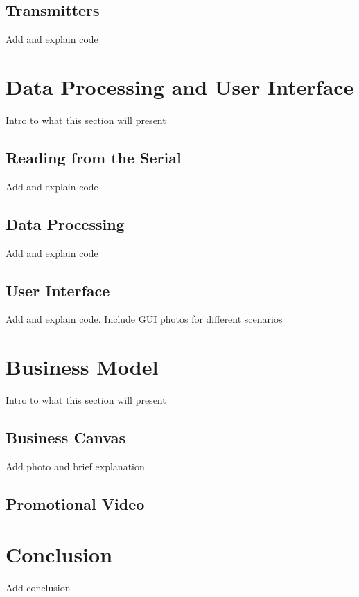 \documentclass{article}
\begin{document}
\subsection{Transmitters}
Add and explain code

\section{Data Processing and User Interface}
Intro to what this section will present

\subsection{Reading from the Serial}
Add and explain code

\subsection{Data Processing}
Add and explain code

\subsection{User Interface}
Add and explain code. Include GUI photos for different scenarios

\section{Business Model}
Intro to what this section will present

\subsection{Business Canvas}
Add photo and brief explanation

\subsection{Promotional Video}

\section{Conclusion}
Add conclusion
\end{document}
